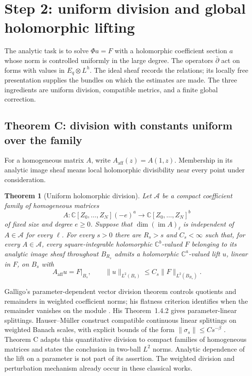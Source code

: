 \documentclass[11pt,reqno]{amsart}
\newtheorem{theorem}{Theorem}
\theoremstyle{remark}
\newcommand{\C}{\mathbb C}
\newcommand{\dbar}{\bar\partial}
\DeclareMathOperator{\im}{im}
\begin{document}
\section{Step 2: uniform division and global holomorphic lifting}
\label{sec:step-two}

The analytic task is to solve $\Phi a=F$ with a holomorphic
coefficient section $a$ whose norm is controlled uniformly in the
large degree. The operators $\dbar$ act on forms with values in
$E_q\otimes L^h$. The ideal sheaf records the relations; its locally
free presentation supplies the bundles on which the estimates are
made. The three ingredients are uniform division, compatible metrics,
and a finite global correction.

\subsection{Theorem C: division  with constants uniform over the family}
For a homogeneous matrix $A$, write $A_{\mathrm{aff}}(z)=A(1,z)$.
Membership in its analytic image sheaf means local holomorphic
divisibility near every point under consideration.

\begin{theorem}[Uniform holomorphic division]\label{thm:division}
Let $\mathcal A$ be a compact coefficient family of homogeneous
matrices
\[
 A:\C[Z_0,\ldots,Z_N](-e)^a\longrightarrow
   \C[Z_0,\ldots,Z_N]^b
\]
of fixed size and degree $e\ge0$. Suppose that $\dim(\im A)_\ell$ is
independent of $A\in\mathcal A$ for every $\ell$.
For every $s>0$ there are $R_s>s$ and $C_s<\infty$ such that, for every
$A\in\mathcal A$, every square-integrable holomorphic $\C^b$-valued
$F$ belonging to its analytic image sheaf throughout $B_{R_s}$
admits a holomorphic $\C^a$-valued lift $u$, linear in $F$, on $B_s$ with
\begin{equation}\label{eq:division}
 A_{\mathrm{aff}}u=F|_{B_s},\qquad
 \|u\|_{L^2(B_s)}\le C_s\|F\|_{L^2(B_{R_s})}.
\end{equation}
\end{theorem}

Galligo's parameter-dependent vector division theorem controls
quotients and remainders in weighted coefficient norms; his
flatness criterion identifies when the remainder vanishes on the
module \cite[Theorems~1.2.7--1.2.8]{Galligo}. His
Theorem~1.4.2 gives parameter-linear splittings. Hauser--M\"uller
construct compatible continuous linear splittings on weighted
Banach scales, with explicit bounds of the form
$\|\sigma_s\|\le C s^{-\beta}$
\cite[Theorems~5.1--5.2]{HauserMuller}.
Theorem C adapts this quantitative division to compact families of
homogeneous matrices and states the conclusion in two-ball $L^2$
norms. Analytic dependence of the lift on a parameter is not part of
its assertion. The weighted division and perturbation mechanism
already occur in these classical works.
\end{document}
